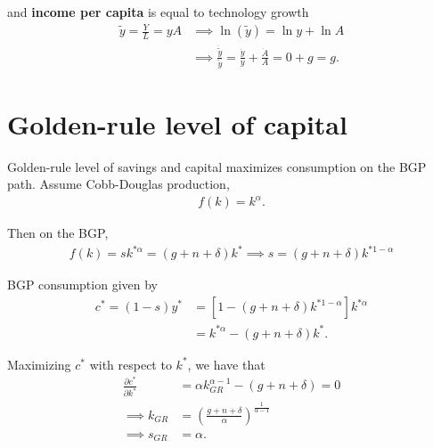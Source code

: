 \documentclass[../main.tex]{subfiles}
\begin{document}
        and \textbf{income per capita} is equal to technology growth
        \begin{align}
            \tilde y = \frac{Y}{L} = y A
            &\implies
            \ln (\tilde y) = \ln y + \ln A
            \\
            &\implies
            \frac{\dot{\tilde y}}{\tilde y} = \frac{\dot y}{y} + \frac{\dot A}{A} = 0 + g = g.
        \end{align}
        
    \section{Golden-rule level of capital}
        
        Golden-rule level of savings and capital maximizes consumption on the BGP path. Assume Cobb-Douglas production,
        \begin{align}
            f(k) = k^\alpha.
        \end{align}
        
        Then on the BGP,
        \begin{align}
            f(k) = s k^{*\alpha} = (g + n + \delta) k^*
            \implies
            s = (g + n + \delta) k^{*1-\alpha}
        \end{align}
        
        BGP consumption given by
        \begin{align}
            c^*
            = (1-s)y^*
            &= [1 - (g + n + \delta) k^{*1-\alpha}] k^{*\alpha}
            \\
            &= k^{*\alpha} - (g + n + \delta) k^*
            .
        \end{align}
        
        Maximizing $c^*$ with respect to $k^*$, we have that
        \begin{align}
            \frac{\partial c^*}{\partial k^*}
            &= \alpha k_{GR}^{\alpha-1}
            - (g + n + \delta)
            = 0
            \\
            \implies
            k_{GR}
            &= \left(\frac{g + n + \delta}{\alpha}\right)^{\frac{1}{\alpha-1}}
            \\
            \implies
            s_{GR} &= \alpha.
        \end{align}
\end{document}
